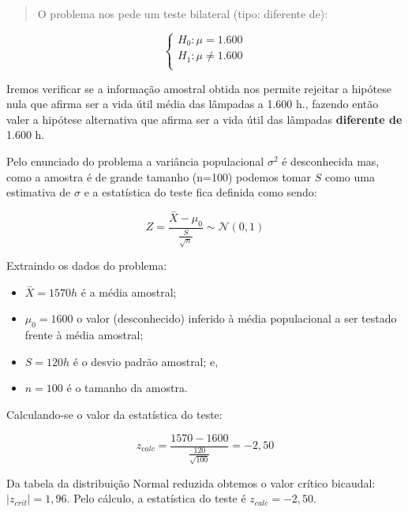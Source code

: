 \documentclass[
]{book}
\providecommand{\tightlist}{%
  \setlength{\itemsep}{0pt}\setlength{\parskip}{0pt}}
\begin{document}
\hfill\break

\begin{quote}
O problema nos pede um teste bilateral (tipo: diferente de):
\end{quote}

\hfill\break

\[
\begin{cases}
    H_{0}: \mu = 1.600\\
    H_{1}: \mu \ne 1.600\\
\end{cases}
\]

Iremos verificar se a informação amostral obtida nos permite rejeitar a hipótese nula que afirma ser a vida útil média das lâmpadas a 1.600 h., fazendo então valer a hipótese alternativa que afirma ser a vida útil das lâmpadas \textbf{diferente de} 1.600 h.

\hfill\break

Pelo enunciado do problema a variância populacional \(\sigma^{2}\) é desconhecida mas, como a amostra é de grande tamanho (n=100) podemos tomar \(S\) como uma estimativa de \(\sigma\) e a estatística do teste fica definida como sendo:

\hfill\break

\[
Z = \frac{\stackrel{-}{X} - \mu_{0}}{\frac{S}{\sqrt{n}}}   \sim \mathcal{N}(0,1)
\]

\hfill\break

Extraindo os dados do problema:

\begin{itemize}
\tightlist
\item
  \(\stackrel{-}{X}=1570h\) é a média amostral;\\
\item
  \(\mu_{0}=1600\) o valor (desconhecido) inferido à média populacional a ser testado frente à média amostral;\\
\item
  \(S=120h\) é o desvio padrão amostral; e,\\
\item
  \(n=100\) é o tamanho da amostra.
\end{itemize}

\hfill\break

Calculando-se o valor da estatística do teste:

\[
z_{calc} = \frac{1570 - 1600}{\frac{120}{\sqrt{100}}   } =-2,50
\]

Da tabela da distribuição Normal reduzida obtemos o valor crítico bicaudal: \(|{z}_{crit}|=1,96\). Pelo cálculo, a estatística do teste é \(z_{calc}=-2,50\).
\end{document}
